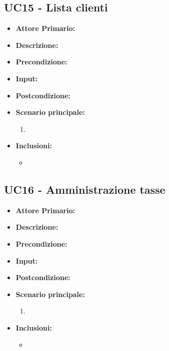 \subsection{UC15 - Lista clienti}
\begin{itemize}
    \item \textbf{Attore Primario:} 
    \item \textbf{Descrizione:}
    \item \textbf{Precondizione:}
    \item \textbf{Input:}
    \item \textbf{Postcondizione:}
    \item \textbf{Scenario principale:}
    \begin{enumerate}
        \item 
    \end{enumerate}
    \item \textbf{Inclusioni:}
    \begin{itemize}
        \item
    \end{itemize}
\end{itemize}
\subsection{UC16 - Amministrazione tasse}
\begin{itemize}
    \item \textbf{Attore Primario:} 
    \item \textbf{Descrizione:}
    \item \textbf{Precondizione:}
    \item \textbf{Input:}
    \item \textbf{Postcondizione:}
    \item \textbf{Scenario principale:}
    \begin{enumerate}
        \item 
    \end{enumerate}
    \item \textbf{Inclusioni:}
    \begin{itemize}
        \item
    \end{itemize}
\end{itemize}
